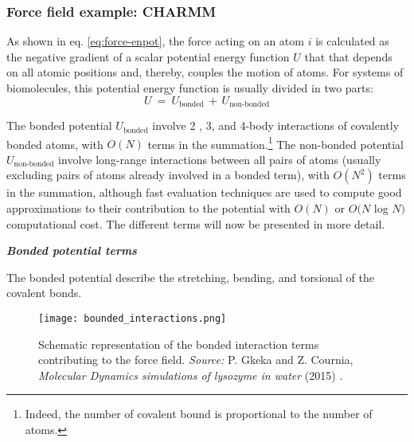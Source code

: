 \subsubsection{Force field example: CHARMM}

As shown in eq. \eqref{eq:force-enpot}, the force acting on an atom $i$ is calculated as the negative gradient of a scalar potential energy function $U$ that that depends on all atomic positions and, thereby, couples the motion of atoms. For systems of biomolecules, this potential energy function is usually divided in two parts:
\begin{equation}\label{eq:forcefield-PotEnergy}
U \: = \: U_{\text{bonded}} \, + \, U_{\text{non-bonded}} 
\end{equation}

The bonded potential $U_{\text{bonded}}$ involve 2 , 3, and 4-body interactions of covalently bonded atoms, with $O(N)$ terms in the summation.\footnote{Indeed, the number of covalent bound is proportional to the number of atoms.}
The non-bonded potential $U_{\text{non-bonded}}$ involve long-range interactions between all pairs of atoms (usually excluding pairs of atoms already involved in a bonded term), with $O(N^2)$ terms in the summation, although fast evaluation techniques are used to compute good approximations to their contribution to the potential with $O(N)$ or $O(N$ log $N )$ computational cost. The different terms will now be presented in more detail.

\vspace{0.25cm}

\begin{center}
{\textbf{\textit{Bonded potential terms}}}
\end{center}
The bonded potential describe the stretching, bending, and torsional of the covalent bonds. 

\begin{figure}[H]
\centering
\begin{minipage}[t]{0.725\textwidth}
	\centering
    \texttt{[image: bounded\_interactions.png]}
    
    \footnotesize{\caption{Schematic representation of the bonded interaction terms contributing to the force field.
    \textit{Source:} P. Gkeka and Z. Cournia, \textit{Molecular Dynamics simulations of lysozyme in water} (2015) 
    \cite{ref:MDsim_Gkeka}.}
    \label{fig:bounded_int}
    }
\end{minipage} 
\end{figure}

